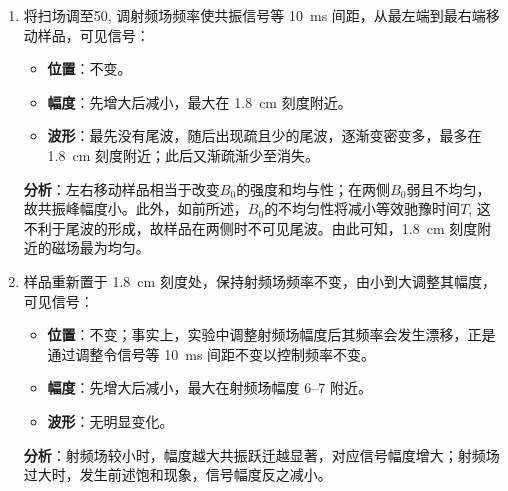 \documentclass[aps,pre,12pt,preprint,%
	onecolumn,showpacs,showkeys,nofootinbib]{revtex4-1}
\begin{document}
\begin{enumerate}[label=(\arabic*),labelindent=0pt]
	\vspace{.5ex}\hspace{0em}\textbf{分析}：
		\begin{itemize}
		\item 相对扫场幅度$\Delta B$而言，初始的共振位置大致处在$B_0\pm\Delta B$区间的中心；不过，随$\Delta B$减小，共振磁场$B$与$B_0$的间距$\abs{B-B_0}$不变，但由于区间长度$2\Delta B$减小，共振点开始区间中点；直到$\Delta B<\abs{B-B_0}$时，$B$完全落在了共振区间之外，此时信号消失。若随之调整共振频率使信号始终间隔 \SI{10}{\ms}, 则可使$B$越加精确地靠近$B_0$, 由此可实现精确测量。
		\item 如上所述，尾波实为共振频率与射频场频率有微小差异时的拍现象；$\Delta B$减小即缩小了共振频范围$\Delta\omega$, 频率越接近，拍频越小，即尾波越疏。
		\end{itemize}
	\vspace{.5ex}
	\item 将扫场调至50, 调射频场频率使共振信号等 \SI{10}{\ms} 间距，从最左端到最右端移动样品，可见信号：
		\begin{itemize}
		\item \textbf{位置}：不变。
		\item \textbf{幅度}：先增大后减小，最大在 \SI{1.8}{\cm} 刻度附近。
		\item \textbf{波形}：最先没有尾波，随后出现疏且少的尾波，逐渐变密变多，最多在 \SI{1.8}{\cm} 刻度附近；此后又渐疏渐少至消失。
		\end{itemize}\clearpage
	\vspace{0ex}\hspace{2em}\textbf{分析}：左右移动样品相当于改变$B_0$的强度和均与性；在两侧$B_0$弱且不均匀，故共振峰幅度小。此外，如前所述，$B_0$的不均匀性将减小等效驰豫时间$T$, 这不利于尾波的形成，故样品在两侧时不可见尾波。由此可知，\SI{1.8}{\cm} 刻度附近的磁场最为均匀。%
	\vspace{-2ex}
	\item 样品重新置于 \SI{1.8}{\cm} 刻度处，保持射频场频率不变，由小到大调整其幅度，可见信号：
		\begin{itemize}
		\item \textbf{位置}：不变；事实上，实验中调整射频场幅度后其频率会发生漂移，正是通过调整令信号等 \SI{10}{\ms} 间距不变以控制频率不变。
		\item \textbf{幅度}：先增大后减小，最大在射频场幅度 \numrange{6}{7} 附近。
		\item \textbf{波形}：无明显变化。
		\end{itemize}
	\vspace{0ex}\hspace{2em}\textbf{分析}：射频场较小时，幅度越大共振跃迁越显著，对应信号幅度增大；射频场过大时，发生前述饱和现象，信号幅度反之减小。
	\end{enumerate}
\end{document}
